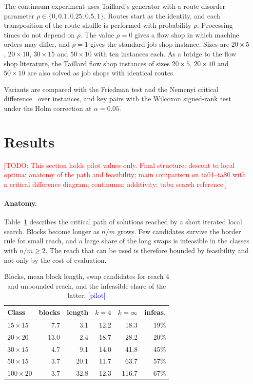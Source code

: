 \documentclass[10pt,twocolumn]{article}
\newcommand{\todo}[1]{\textcolor{red}{[TODO: #1]}}
\newcommand{\pilot}{\textcolor{blue}{[pilot]}}
\begin{document}
The continuum experiment uses Taillard's generator with a route disorder
parameter $\rho\in\{0,0.1,0.25,0.5,1\}$. Routes start as the identity,
and each transposition of the route shuffle is performed with probability
$\rho$. Processing times do not depend on $\rho$. The value $\rho=0$ gives
a flow shop in which machine orders may differ, and $\rho=1$ gives the
standard job shop instance. Sizes are $20\times5$, $20\times10$,
$30\times15$ and $50\times10$ with ten instances each. As a bridge to the
flow shop literature, the Taillard flow shop instances of sizes
$20\times5$, $20\times10$ and $50\times10$ are also solved as job shops
with identical routes.

Variants are compared with the Friedman test and the Nemenyi critical
difference~\cite{demsar2006} over instances, and key pairs with the
Wilcoxon signed-rank test under the Holm correction at $\alpha=0.05$.

\section{Results}\label{sec:exp}

\todo{This section holds pilot values only. Final structure: descent to
local optima; anatomy of the path and feasibility; main comparison on
ta01--ta80 with a critical difference diagram; continuum; additivity;
tabu search reference.}

\paragraph{Anatomy.}
Table~\ref{tab:anatomy} describes the critical path of solutions reached
by a short iterated local search. Blocks become longer as $n/m$ grows.
Few candidates survive the border rule for small reach, and a large share
of the long swaps is infeasible in the classes with $n/m\ge2$. The reach
that can be used is therefore bounded by feasibility and not only by the
cost of evaluation.

\begin{table}[t]
\centering\small
\begin{tabular}{@{}lrrrrr@{}}
\toprule
Class & blocks & length & $k{=}4$ & $k{=}\infty$ & infeas. \\
\midrule
$15\times15$  & 7.7  & 3.1  & 12.2 & 18.3  & 19\% \\
$20\times20$  & 13.0 & 2.4  & 18.7 & 28.2  & 20\% \\
$30\times15$  & 4.7  & 9.1  & 14.0 & 41.8  & 45\% \\
$50\times15$  & 3.7  & 20.1 & 11.7 & 63.7  & 57\% \\
$100\times20$ & 3.7  & 32.8 & 12.3 & 116.7 & 67\% \\
\bottomrule
\end{tabular}
\caption{Blocks, mean block length, swap candidates for reach 4 and
unbounded reach, and the infeasible share of the latter. \pilot}
\label{tab:anatomy}
\end{table}
\end{document}
